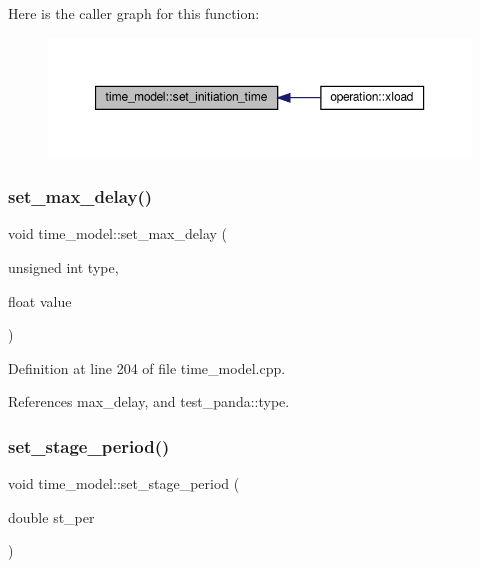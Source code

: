 Here is the caller graph for this function\+:
\nopagebreak
\begin{figure}[H]
\begin{center}
\leavevmode
\includegraphics[width=350pt]{d3/d73/classtime__model_aae177f12db540a3e8d5b487f99ded5e8_icgraph}
\end{center}
\end{figure}
\mbox{\label{classtime__model_acd053b74c6a18db11a5de646875be6ea}} 
\subsubsection{\texorpdfstring{set\+\_\+max\+\_\+delay()}{set\_max\_delay()}}
{\footnotesize\ttfamily void time\+\_\+model\+::set\+\_\+max\+\_\+delay (\begin{DoxyParamCaption}\item[{unsigned int}]{type,  }\item[{float}]{value }\end{DoxyParamCaption})}



Definition at line 204 of file time\+\_\+model.\+cpp.



References max\+\_\+delay, and test\+\_\+panda\+::type.

\mbox{\label{classtime__model_a77760cc70901f92295314797e5a50ba1}} 
\subsubsection{\texorpdfstring{set\+\_\+stage\+\_\+period()}{set\_stage\_period()}}
{\footnotesize\ttfamily void time\+\_\+model\+::set\+\_\+stage\+\_\+period (\begin{DoxyParamCaption}\item[{double}]{st\+\_\+per }\end{DoxyParamCaption})}




